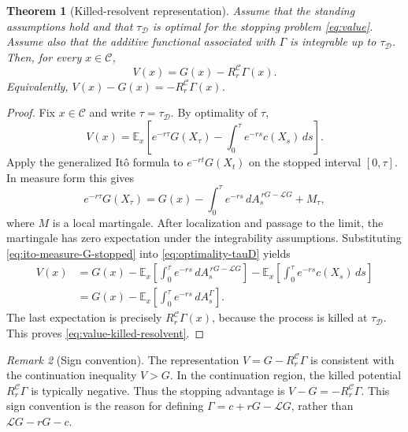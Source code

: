 \documentclass[pdflatex,sn-mathphys-num]{sn-jnl}
\theoremstyle{plain}
\newtheorem{theorem}{Theorem}[section]
\theoremstyle{definition}
\theoremstyle{remark}
\newtheorem{remark}[theorem]{Remark}
\numberwithin{equation}{section}
\begin{document}
\begin{theorem}[Killed-resolvent representation] \label{thm:killed-resolvent-representation} 
Assume that the standing assumptions hold and that \(\tau_{\mathcal D}\) is optimal for the stopping problem \eqref{eq:value}. Assume also that the additive functional associated with \(\Gamma\) is integrable up to \(\tau_{\mathcal D}\). Then, for every \(x\in\mathcal C\), 
\begin{equation}\label{eq:value-killed-resolvent}
V(x)=G(x)-R_r^{\mathcal C}\Gamma(x).
\end{equation}
Equivalently, 
$V(x)-G(x) = -R_r^{\mathcal C}\Gamma(x)$. 
\end{theorem} 
\begin{proof} 
Fix \(x\in\mathcal C\) and write \(\tau=\tau_{\mathcal D}\). By optimality of \(\tau\), 
\begin{equation} \label{eq:optimality-tauD} 
V(x) = \mathbb E_x \left[ e^{-r\tau}G(X_\tau) - \int_0^\tau e^{-rs}c(X_s)\,ds \right]. 
\end{equation} 
Apply the generalized It\^{o} formula to \(e^{-rt}G(X_t)\) on the stopped interval \([0,\tau]\). In measure form this gives \begin{equation} \label{eq:ito-measure-G-stopped} 
e^{-r\tau}G(X_\tau) = G(x) - \int_0^\tau e^{-rs}\,dA_s^{\,rG-\mathcal LG} + M_\tau , 
\end{equation} 
where \(M\) is a local martingale. After localization and passage to the limit, the martingale has zero expectation under the integrability assumptions. Substituting \eqref{eq:ito-measure-G-stopped} into \eqref{eq:optimality-tauD} yields 
\begin{align*} 
V(x) &= G(x) - \mathbb E_x \left[ \int_0^\tau e^{-rs}\,dA_s^{\,rG-\mathcal LG} \right] - \mathbb E_x \left[ \int_0^\tau e^{-rs}c(X_s)\,ds \right] \\ 
&= G(x) - \mathbb E_x \left[ \int_0^\tau e^{-rs}\,dA_s^\Gamma \right] . 
\end{align*} 
The last expectation is precisely \(R_r^{\mathcal C}\Gamma(x)\), because the process is killed at \(\tau_{\mathcal D}\). This proves \eqref{eq:value-killed-resolvent}. 
\end{proof} 

\begin{remark}[Sign convention] \label{rem:sign-convention} 
The representation 
$V=G-R_r^{\mathcal C}\Gamma$ 
is consistent with the continuation inequality \(V>G\). In the continuation region, the killed potential \(R_r^{\mathcal C}\Gamma\) is typically negative. Thus the stopping advantage is 
$V-G=-R_r^{\mathcal C}\Gamma$. 
This sign convention is the reason for defining \(\Gamma=c+rG-\mathcal LG\), rather than \(\mathcal LG-rG-c\). 
\end{remark} 
\end{document}
